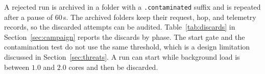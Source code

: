 A rejected run is archived in a folder with a \texttt{.contaminated} suffix and is repeated after a pause of 60\,s. The archived folders keep their request, hop, and telemetry records, so the discarded attempts can be audited. Table~\ref{tab:discards} in Section~\ref{sec:campaign} reports the discards by phase. The start gate and the contamination test do not use the same threshold, which is a design limitation discussed in Section~\ref{sec:threats}. A run can start while background load is between $1.0$ and $2.0$ cores and then be discarded.
